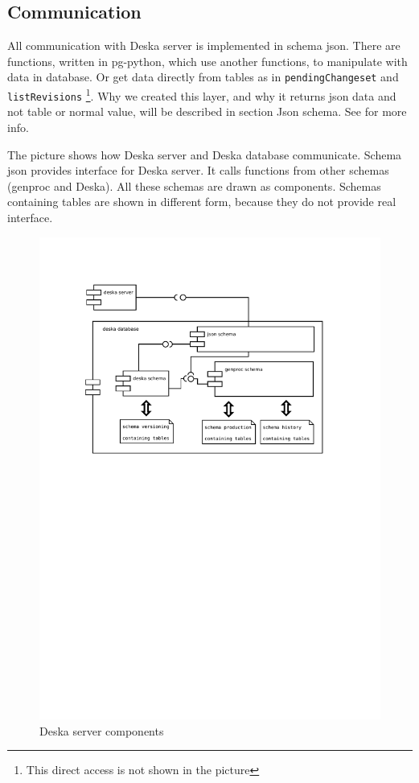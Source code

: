 \documentclass[deska]{subfiles}
\begin{document}
\subsection{Communication}
All communication with Deska server is implemented in schema json. There are functions, written in pg-python, which use another
functions, to manipulate with data in database. Or get data directly from tables as in {\tt pendingChangeset} and {\tt listRevisions}
\footnote{This direct access is not shown in the picture}.
Why we created this layer, and why it returns json data and not table or normal value, will be described in section Json schema.
See  for more info.

The picture shows how Deska server and Deska database communicate. Schema json provides interface for Deska server. It
calls functions from other schemas (genproc and Deska). All these schemas are drawn as components. Schemas containing
tables are shown in different form, because they do not provide real interface.
\begin{figure}[h]
	\centering
	\includegraphics[trim=28mm 170mm 30mm 28mm]{img-deska-server-components.pdf}
	\caption{Deska server components}
\end{figure}
\end{document}
